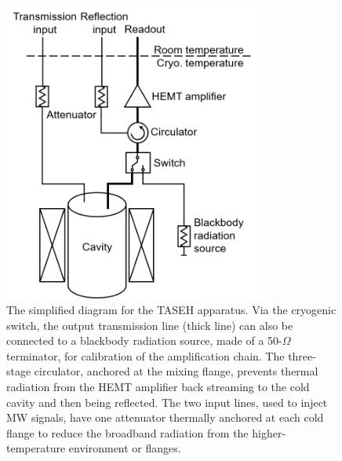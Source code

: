 \documentclass[%
 reprint,prl, %
superscriptaddress,
nobibnotes,
 amsmath,amssymb,
 aps,
]{revtex4-2}
\begin{document}
\begin{figure} 
  \centering
  \includegraphics[width=8.6cm]{figures/Simplified_wiring_V2.png}
  \caption{%
   The simplified diagram for the TASEH apparatus.
 Via the cryogenic switch, the output transmission 
 line (thick line) can also be connected 
 to a blackbody radiation source, made of a 50-$\Omega$ terminator, 
 for calibration of the amplification chain. 
 The three-stage circulator, anchored at the mixing flange, 
 prevents thermal radiation from the HEMT                   
 amplifier back streaming to the cold cavity and then being reflected.  
 The two input lines, used to inject MW signals, have one attenuator 
 thermally anchored at each cold flange to reduce the broadband 
 radiation from the higher-temperature environment or flanges.    
  }
  \label{fig:TASEH}
\end{figure}


\end{document}
